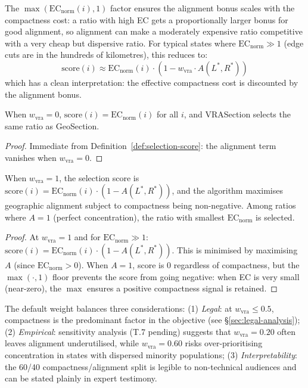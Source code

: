 The $\max(\mathrm{EC}_\text{norm}(i), 1)$ factor ensures the alignment
bonus scales with the compactness cost: a ratio with high EC gets a
proportionally larger bonus for good alignment, so alignment can make a
moderately expensive ratio competitive with a very cheap but dispersive ratio.
For typical states where $\mathrm{EC}_\text{norm} \gg 1$ (edge cuts are in
the hundreds of kilometres), this reduces to:
\[
  \mathrm{score}(i) \approx \mathrm{EC}_\text{norm}(i) \cdot (1 - w_\text{vra} \cdot A(L^*, R^*))
\]
which has a clean interpretation: the effective compactness cost is discounted
by the alignment bonus.

\begin{proposition}[VRASection reduces to GeoSection at $w_\text{vra} = 0$]
\label{prop:geosection}
When $w_\text{vra} = 0$, $\mathrm{score}(i) = \mathrm{EC}_\text{norm}(i)$
for all $i$, and VRASection selects the same ratio as GeoSection.
\end{proposition}

\begin{proof}
Immediate from Definition~\ref{def:selection-score}: the alignment term
vanishes when $w_\text{vra} = 0$.
\end{proof}

\begin{proposition}[Pure geographic concentration at $w_\text{vra} = 1$]
\label{prop:pure-concentration}
When $w_\text{vra} = 1$, the selection score is
$\mathrm{score}(i) = \mathrm{EC}_\text{norm}(i) \cdot (1 - A(L^*, R^*))$,
and the algorithm maximises geographic alignment subject to compactness
being non-negative.
Among ratios where $A = 1$ (perfect concentration), the ratio with smallest
$\mathrm{EC}_\text{norm}$ is selected.
\end{proposition}

\begin{proof}
At $w_\text{vra} = 1$ and for $\mathrm{EC}_\text{norm} \gg 1$:
$\mathrm{score}(i) = \mathrm{EC}_\text{norm}(i) \cdot (1 - A(L^*, R^*))$.
This is minimised by maximising $A$ (since $\mathrm{EC}_\text{norm} > 0$).
When $A = 1$, score is 0 regardless of compactness, but the $\max(\cdot, 1)$
floor prevents the score from going negative: when EC is very small
(near-zero), the $\max$ ensures a positive compactness signal is retained.
\end{proof}

\begin{remark}[Proposed default $w_\text{vra} = 0.40$]
The default weight balances three considerations:
(1) \emph{Legal}: at $w_\text{vra} \leq 0.5$, compactness is the predominant
factor in the objective (see \S\ref{sec:legal-analysis});
(2) \emph{Empirical}: sensitivity analysis (T.7 pending) suggests that
$w_\text{vra} = 0.20$ often leaves alignment underutilised,
while $w_\text{vra} = 0.60$ risks over-prioritising concentration in states
with dispersed minority populations;
(3) \emph{Interpretability}: the 60/40 compactness/alignment split
is legible to non-technical audiences and can be stated plainly in
expert testimony.
\end{remark}

